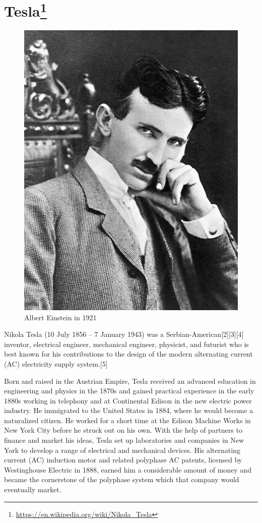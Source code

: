 \section*{Tesla\protect\footnote{\url{https://en.wikipedia.org/wiki/Nikola_Tesla}}}

\begin{figure}[ht]
  \centering
  \includegraphics[width=0.8\linewidth]{content/figures/nikola_tesla_picture.jpg}
  \caption{Albert Einstein in 1921\protect\footnotemark}
\end{figure}

Nikola Tesla (10 July 1856 – 7 January 1943) was a Serbian-American[2][3][4] inventor, electrical engineer, mechanical engineer, physicist, and futurist who is best known for his contributions to the design of the modern alternating current (AC) electricity supply system.[5]

Born and raised in the Austrian Empire, Tesla received an advanced education in engineering and physics in the 1870s and gained practical experience in the early 1880s working in telephony and at Continental Edison in the new electric power industry. He immigrated to the United States in 1884, where he would become a naturalized citizen. He worked for a short time at the Edison Machine Works in New York City before he struck out on his own. With the help of partners to finance and market his ideas, Tesla set up laboratories and companies in New York to develop a range of electrical and mechanical devices. His alternating current (AC) induction motor and related polyphase AC patents, licensed by Westinghouse Electric in 1888, earned him a considerable amount of money and became the cornerstone of the polyphase system which that company would eventually market.
